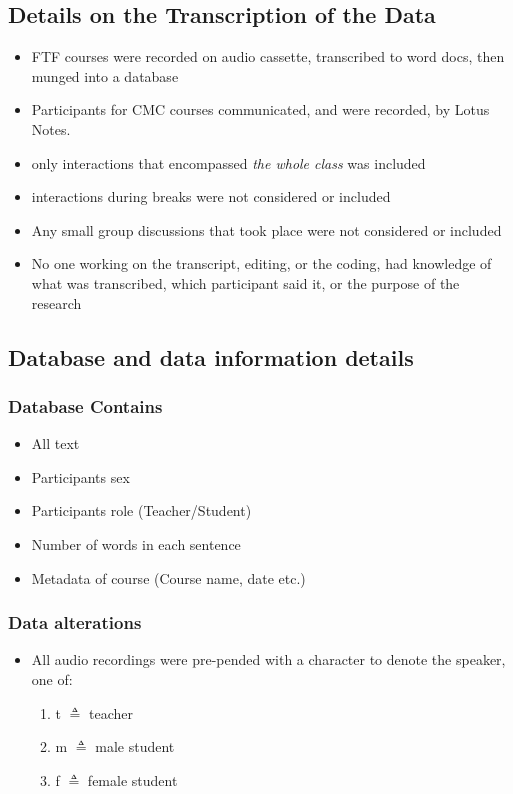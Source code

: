 \documentclass[10pt, letterpaper]{article}
\begin{document}
\subsection*{Details on the Transcription of the Data}
\label{sec:org89b7396}
\begin{itemize}
\item FTF courses were recorded on audio cassette, transcribed to word docs, then
munged into a database
\item Participants for CMC courses communicated, and were recorded, by Lotus Notes.
\item only interactions that encompassed \emph{the whole class} was included
\item interactions during breaks were not considered or included
\item Any small group discussions that took place were not considered or included
\item No one working on the transcript, editing, or the coding, had knowledge of
what was transcribed, which participant said it, or the purpose of the
research
\end{itemize}

\subsection*{Database and data information details}
\label{sec:org1d27a59}
\subsubsection*{Database Contains}
\label{sec:org13b995b}
\begin{itemize}
\item All text
\item Participants sex
\item Participants role (Teacher/Student)
\item Number of words in each sentence
\item Metadata of course (Course name, date etc.)
\end{itemize}
\subsubsection*{Data alterations}
\label{sec:orgb87bfab}
\begin{itemize}
\item All audio recordings were pre-pended with a character to denote the speaker, one of:
\begin{enumerate}
\item t \(\triangleq\) teacher
\item m \(\triangleq\) male student
\item f \(\triangleq\) female student
\end{enumerate}
\end{itemize}
\end{document}
